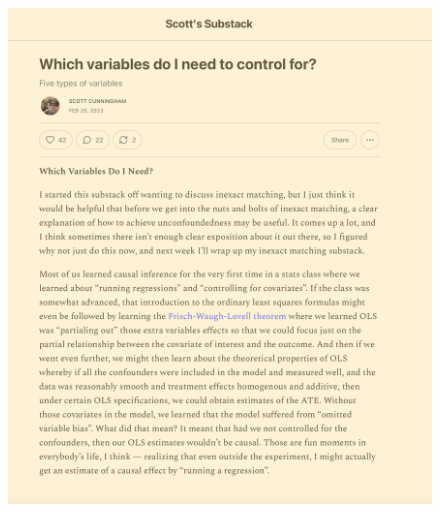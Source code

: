 \documentclass{beamer}
\begin{document}
\begin{frame}{}

  \begin{figure}
    \includegraphics[scale=0.25]{./lecture_includes/scott_controls}
  \end{figure}

\end{frame}
\end{document}
